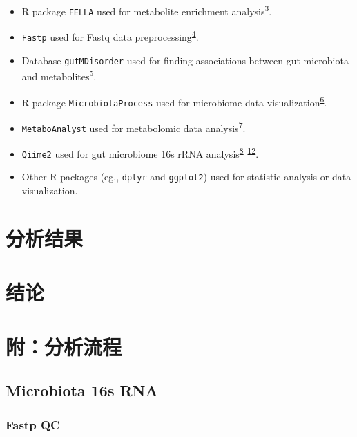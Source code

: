\documentclass[
]{article}
\providecommand{\tightlist}{%
  \setlength{\itemsep}{0pt}\setlength{\parskip}{0pt}}
\begin{document}
\begin{itemize}
\tightlist
\item
  R package \texttt{FELLA} used for metabolite enrichment analysis\textsuperscript{\protect\hyperlink{ref-FellaAnRPacPicart2018}{3}}.
\item
  \texttt{Fastp} used for Fastq data preprocessing\textsuperscript{\protect\hyperlink{ref-UltrafastOnePChen2023}{4}}.
\item
  Database \texttt{gutMDisorder} used for finding associations between gut microbiota and metabolites\textsuperscript{\protect\hyperlink{ref-GutmdisorderACheng2019}{5}}.
\item
  R package \texttt{MicrobiotaProcess} used for microbiome data visualization\textsuperscript{\protect\hyperlink{ref-MicrobiotaproceXuSh2023}{6}}.
\item
  \texttt{MetaboAnalyst} used for metabolomic data analysis\textsuperscript{\protect\hyperlink{ref-Metaboanalyst4Chong2018}{7}}.
\item
  \texttt{Qiime2} used for gut microbiome 16s rRNA analysis\textsuperscript{\protect\hyperlink{ref-ReproducibleIBolyen2019}{8}--\protect\hyperlink{ref-MicrobialCommuHamday2009}{12}}.
\item
  Other R packages (eg., \texttt{dplyr} and \texttt{ggplot2}) used for statistic analysis or data visualization.
\end{itemize}

\hypertarget{results}{%
\section{分析结果}\label{results}}

\hypertarget{dis}{%
\section{结论}\label{dis}}

\hypertarget{workflow}{%
\section{附：分析流程}\label{workflow}}

\hypertarget{microbiota-16s-rna}{%
\subsection{Microbiota 16s RNA}\label{microbiota-16s-rna}}

\hypertarget{fastp-qc}{%
\subsubsection{Fastp QC}\label{fastp-qc}}
\end{document}
